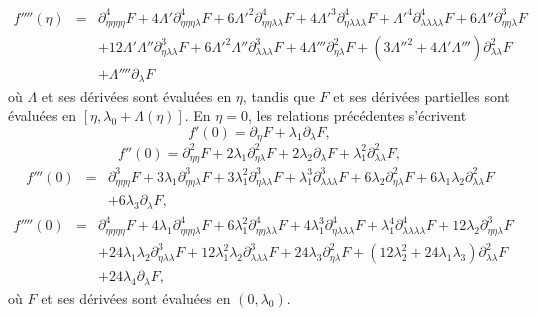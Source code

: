 \documentclass[12pt, final]{amsart}
\begin{document}
\begin{eqnarray}
  f'''' (\eta) & = & \partial_{\eta  \eta  \eta
  \eta}^4 F + 4 \Lambda' \partial_{\eta  \eta  \eta
  \lambda}^4 {F + 6 \Lambda'}^2 \partial_{\eta  \eta  \lambda
   \lambda}^4 {F + 4 \Lambda'}^3 \partial_{\eta  \lambda
   \lambda  \lambda}^4 {F + \Lambda'}^4 \partial_{\lambda
   \lambda  \lambda  \lambda}^4 F + 6 \Lambda''
  \partial_{\eta  \eta  \lambda}^3 F \nonumber\\
  &  & + 12 \Lambda' \Lambda'' \partial_{\eta  \lambda
  \lambda}^3 {F + 6 \Lambda'}^2 \Lambda'' \partial_{\lambda  \lambda
   \lambda}^3 F + 4 \Lambda''' \partial_{\eta  \lambda}^2 F +
  \left( {3 \Lambda''}^2 + 4 \Lambda' \Lambda''' \right) \partial_{\lambda
   \lambda}^2 F \\
  &  & + \Lambda'''' \partial_{\lambda} F
\end{eqnarray}
où $\Lambda$ et ses dérivées sont évaluées en $\eta$,
tandis que $F$ et ses dérivées partielles sont évaluées en
$[\eta, \lambda_0 + \Lambda (\eta)]$. En $\eta = 0$, les relations
précédentes s'écrivent
\begin{equation}
  \label{eq20220107060454} f' (0) = \partial_{\eta} F + \lambda_1
  \partial_{\lambda} F,
\end{equation}
\begin{equation}
  \label{eq20220107124311} f'' (0) = \partial_{\eta  \eta}^2 F + 2
  \lambda_1 \partial_{\eta  \lambda}^2 F + 2 \lambda_2
  \partial_{\lambda} F + \lambda_1^2 \partial_{\lambda  \lambda}^2 F,
\end{equation}
\begin{eqnarray}
  f''' (0) & = & \partial_{\eta  \eta  \eta}^3 F + 3 \lambda_1
  \partial_{\eta  \eta  \lambda}^3 F + 3 \lambda_1^2
  \partial_{\eta  \lambda  \lambda}^3 F + \lambda_1^3
  \partial_{\lambda  \lambda  \lambda}^3 F + 6 \lambda_2
  \partial_{\eta  \lambda}^2 F + 6 \lambda_1 \lambda_2
  \partial_{\lambda  \lambda}^2 F \nonumber\\
  &  &  + 6 \lambda_3 \partial_{\lambda} F,
  \label{eq20220107060500}
\end{eqnarray}
\begin{eqnarray}
  f'''' (0) & = & \partial_{\eta  \eta  \eta  \eta}^4
  F + 4 \lambda_1 \partial_{\eta  \eta  \eta
  \lambda}^4 F + 6 \lambda_1^2 \partial_{\eta  \eta  \lambda
   \lambda}^4 F + 4 \lambda_1^3 \partial_{\eta  \lambda
   \lambda  \lambda}^4 F + \lambda_1^4 \partial_{\lambda
   \lambda  \lambda  \lambda}^4 F + 12 \lambda_2
  \partial_{\eta  \eta  \lambda}^3 F \nonumber\\
  &  & + 24 \lambda_1 \lambda_2 \partial_{\eta  \lambda
  \lambda}^3 F + 12 \lambda_1^2 \lambda_2 \partial_{\lambda  \lambda
   \lambda}^3 F + 24 \lambda_3 \partial_{\eta  \lambda}^2 F +
  (12 \lambda_2^2 + 24 \lambda_1 \lambda_3) \partial_{\lambda
  \lambda}^2 F \nonumber\\
  &  & + 24 \lambda_4 \partial_{\lambda} F,
\end{eqnarray}
où $F$ et ses dérivées sont évaluées en $(0, \lambda_0)$.
\end{document}
